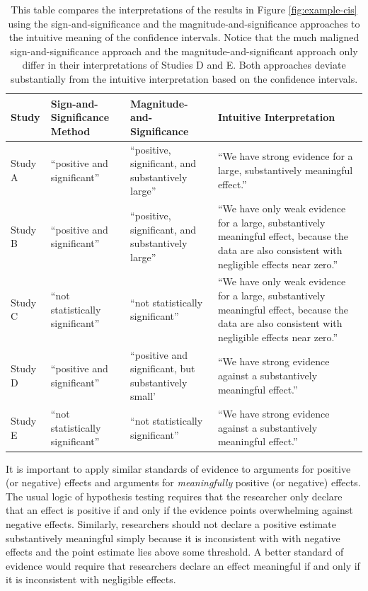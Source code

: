 \documentclass[12pt]{article}
\begin{document}
\renewcommand{\arraystretch}{1.5}
\begin{table}
\begin{center}
\begin{scriptsize}
\begin{tabular}{|>{\centering\arraybackslash}m{.5in}>{\centering\arraybackslash}m{1.75in}>{\centering\arraybackslash}m{1.75in}>{\centering\arraybackslash}
m{1.75in}|}
\hline
Study & Sign-and-Significance Method & Magnitude-and-Significance & Intuitive Interpretation\\ 
\hline
Study A & ``positive and significant'' & ``positive, significant, and substantively large'' & ``We have strong evidence for a large, substantively meaningful effect.''\\
Study B & ``positive and significant'' & ``positive, significant, and substantively large'' & ``We have only weak evidence for a large, substantively meaningful effect, because the data are also consistent with negligible effects near zero.''\\
Study C & ``not statistically significant'' & ``not statistically significant'' & ``We have only weak evidence for a large, substantively meaningful effect, because the data are also consistent with negligible effects near zero.''\\
Study D & ``positive and significant'' & ``positive and significant, but substantively small' & ``We have strong evidence against a substantively meaningful effect.''\\
Study E & ``not statistically significant'' & ``not statistically significant'' & ``We have strong evidence against a substantively meaningful effect.''\\
\hline
\end{tabular}\caption{This table compares the interpretations of the results in Figure \ref{fig:example-cis} using the sign-and-significance and the magnitude-and-significance approaches to the intuitive meaning of the confidence intervals. Notice that the much maligned sign-and-significance approach and the magnitude-and-significant approach only differ in their interpretations of Studies D and E. Both approaches deviate substantially from the intuitive interpretation based on the confidence intervals.}\label{tab:example-cis}
\end{scriptsize}
\end{center}
\end{table}

It is important to apply similar standards of evidence to arguments for positive (or negative) effects and arguments for \emph{meaningfully} positive (or negative) effects. The usual logic of hypothesis testing requires that the researcher only declare that an effect is positive if and only if the evidence points overwhelming against negative effects. Similarly, researchers should not declare a positive estimate substantively meaningful simply because it is inconsistent with with negative effects and the point estimate lies above some threshold. A better standard of evidence would require that researchers declare an effect meaningful if and only if it is inconsistent with negligible effects.
\end{document}
